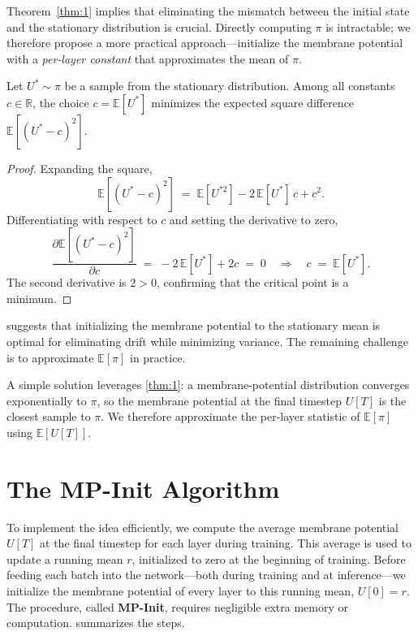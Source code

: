 Theorem~\ref{thm:1} implies that eliminating the mismatch between the initial state and the stationary distribution is crucial. Directly computing $\pi$ is intractable; we therefore propose a more practical approach—initialize the membrane potential with a \emph{per-layer constant} that approximates the mean of $\pi$.

\begin{lemma}
\label{lemma:1}
Let $U^{*}\sim \pi$ be a sample from the stationary distribution. Among all constants $c \in \mathbb{R}$, the choice $c = \mathbb{E}[U^{*}]$ minimizes the expected square difference $\mathbb{E}[(U^{*}-c)^{2}]$.
\end{lemma}

\begin{proof}
Expanding the square,
\begin{equation}
    \mathbb{E}[(U^{*}-c)^{2}] \;=\; \mathbb{E}[U^{*2}] - 2\,\mathbb{E}[U^{*}]\,c + c^{2}.
\end{equation}
Differentiating with respect to $c$ and setting the derivative to zero,
\begin{equation}
    \frac{\partial \mathbb{E}[(U^{*}-c)^{2}]}{\partial c} \;=\; -2\,\mathbb{E}[U^{*}] + 2c \;=\; 0
    \quad\Longrightarrow\quad
    c \;=\; \mathbb{E}[U^{*}].
\end{equation}
The second derivative is $2>0$, confirming that the critical point is a minimum.
\end{proof}

 suggests that initializing the membrane potential to the stationary mean is optimal for eliminating drift while minimizing variance. The remaining challenge is to approximate $\mathbb{E}[\pi]$ in practice.

A simple solution leverages \cref{thm:1}: a membrane-potential distribution converges exponentially to $\pi$, so the membrane potential at the final timestep $U[T]$ is the closest sample to $\pi$. We therefore approximate the per-layer statistic of $\mathbb{E}[\pi]$ using $\mathbb{E}[U[T]]$.

\section{The MP-Init Algorithm}
\label{sec:mpinit_algorithm}

To implement the idea efficiently, we compute the average membrane potential $U[T]$ at the final timestep for each layer during training. This average is used to update a running mean $r$, initialized to zero at the beginning of training. Before feeding each batch into the network—both during training and at inference—we initialize the membrane potential of every layer to this running mean, $U[0] = r$. The procedure, called \textbf{MP-Init}, requires negligible extra memory or computation.  summarizes the steps.

